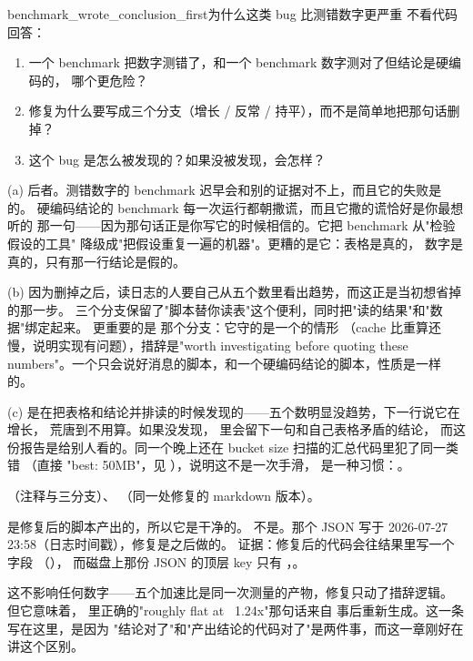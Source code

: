 \begin{checkpoint}{benchmark_wrote_conclusion_first}{为什么这类 bug 比测错数字更严重}
不看代码回答：
\begin{enumerate}[label=(\alph*)]
  \item 一个 benchmark 把数字测错了，和一个 benchmark 数字测对了但结论是硬编码的，
        哪个更危险？
  \item 修复为什么要写成三个分支（增长 / 反常 / 持平），而不是简单地把那句话删掉？
  \item 这个 bug 是怎么被发现的？如果没被发现，会怎样？
\end{enumerate}

\ifshowanswers
\tcblower
\answer (a) 后者。测错数字的 benchmark 迟早会和别的证据对不上，而且它的失败是的。
硬编码结论的 benchmark 每一次运行都朝撒谎，而且它撒的谎恰好是你最想听的
那一句——因为那句话正是你写它的时候相信的。它把 benchmark 从"检验假设的工具"
降级成"把假设重复一遍的机器"。更糟的是它：表格是真的，
数字是真的，只有那一行结论是假的。

(b) 因为删掉之后，读日志的人要自己从五个数里看出趋势，而这正是当初想省掉的那一步。
三个分支保留了"脚本替你读表"这个便利，同时把"读的结果"和"数据"绑定起来。
更重要的是  那个分支：它守的是一个的情形
（cache 比重算还慢，说明实现有问题），措辞是"worth investigating before quoting these
numbers"。一个只会说好消息的脚本，和一个硬编码结论的脚本，性质是一样的。

(c) 是在把表格和结论并排读的时候发现的——五个数明显没趋势，下一行说它在增长，
荒唐到不用算。如果没发现， 里会留下一句和自己表格矛盾的结论，
而这份报告是给别人看的。同一个晚上还在 bucket size 扫描的汇总代码里犯了同一类错
（直接  "best: 50MB"，见 ），说明这不是一次手滑，
是一种习惯：。

\whereincode {}（注释与三分支）、
（同一处修复的 markdown 版本）。
\fi
\end{checkpoint}

\begin{misconception}{ 是修复后的脚本产出的，所以它是干净的。}
不是。那个 JSON 写于 2026-07-27 23:58（日志时间戳），修复是之后做的。
证据：修复后的代码会往结果里写一个  字段
（），
而磁盘上那份 JSON 的顶层 key 只有
，。

这不影响任何数字——五个加速比是同一次测量的产物，修复只动了措辞逻辑。
但它意味着，
 里正确的"roughly flat at ~1.24x"那句话来自
 事后重新生成。这一条写在这里，是因为
"结论对了"和"产出结论的代码对了"是两件事，而这一章刚好在讲这个区别。
\end{misconception}

